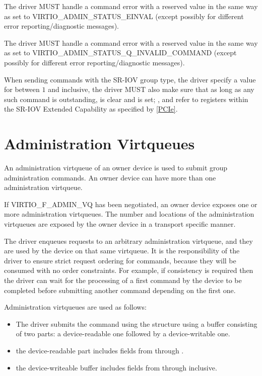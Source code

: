 The driver MUST handle a command error with a reserved 
value in the same way as  set to VIRTIO_ADMIN_STATUS_EINVAL
(except possibly for different error reporting/diagnostic messages).

The driver MUST handle a command error with a reserved
 value in the same way as
 set to
VIRTIO_ADMIN_STATUS_Q_INVALID_COMMAND (except possibly for
different error reporting/diagnostic messages).

When sending commands with the SR-IOV group type,
the driver specify a value for 
between $1$ and  inclusive,
the driver MUST also make sure that as long as any such command
is outstanding,  is clear and
 is set;
,   and
 refer to registers within the SR-IOV Extended
Capability as specified by \hyperref[intro:PCIe]{[PCIe]}.

\section{Administration Virtqueues}\label{sec:Basic Facilities of a Virtio Device / Administration Virtqueues}

An administration virtqueue of an owner device is used to submit
group administration commands. An owner device can have more
than one administration virtqueue.

If VIRTIO_F_ADMIN_VQ has been negotiated, an owner device exposes one
or more administration virtqueues. The number and locations of the
administration virtqueues are exposed by the owner device in a transport
specific manner.

The driver enqueues requests to an arbitrary administration
virtqueue, and they are used by the device on that same
virtqueue. It is the responsibility of the driver to ensure
strict request ordering for commands, because they will be
consumed with no order constraints.  For example, if consistency
is required then the driver can wait for the processing of a
first command by the device to be completed before submitting
another command depending on the first one.

Administration virtqueues are used as follows:
\begin{itemize}
\item The driver submits the command using the 
structure using a buffer consisting of two parts: a device-readable one followed by a
device-writable one.
\item the device-readable part includes fields from 
through .
\item the device-writeable buffer includes fields from 
through  inclusive.
\end{itemize}

